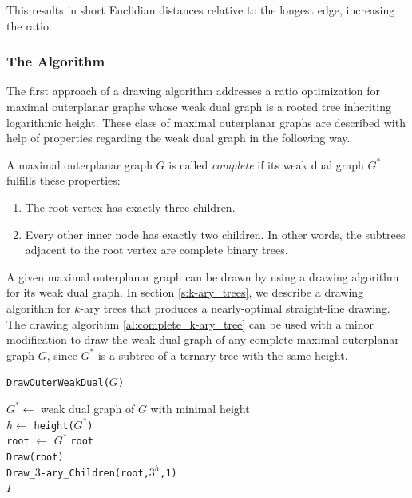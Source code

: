 This results in short Euclidian distances relative to the longest edge, increasing the ratio.
\subsubsection{The Algorithm}
The first approach of a drawing algorithm addresses a ratio optimization for maximal outerplanar graphs whose weak dual graph is a rooted tree inheriting logarithmic height. These class of maximal outerplanar graphs are described with help of properties regarding the weak dual graph in the following way.
\begin{definition}\label{def:complete_maximal_outerplanar}
	A maximal outerplanar graph $G$ is called \emph{complete} if its weak dual graph $G^*$ fulfills these properties:
	\begin{enumerate}
		\item The root vertex has exactly three children.
		\item Every other inner node has exactly two children. In other words, the subtrees adjacent to the root vertex are complete binary trees.
	\end{enumerate}
\end{definition}
A given maximal outerplanar graph can be drawn by using a drawing algorithm for its weak dual graph. In section \ref{s:k-ary_trees}, we describe a drawing algorithm for $k$-ary trees that produces a nearly-optimal straight-line drawing. The drawing algorithm \ref{al:complete_k-ary_tree} can be used with a minor modification to draw the weak dual graph of any complete maximal outerplanar graph $G$, since $G^*$ is a subtree of a ternary tree with the same height.\\

\begin{algorithm}[H]
	\caption{\texttt{DrawOuterWeakDual($G$)}}\label{al:drawouterweakdual}
	$G^* \gets$ weak dual graph of $G$ with minimal height\\
	$h \gets$ \texttt{height($G^*$)}\\
	\texttt{root} $\gets$ $G^*$.\texttt{root}\\
	\texttt{Draw(root)}\\
	\texttt{Draw\_$3$-ary\_Children(\texttt{root},$3^h$,1)}\\
	\Return $\Gamma$
\end{algorithm}

